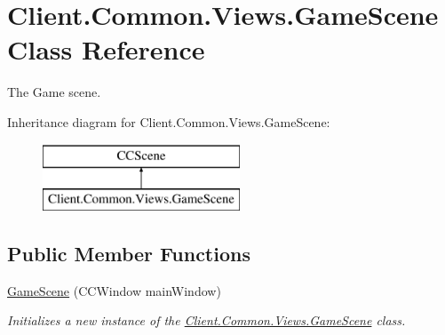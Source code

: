 \hypertarget{classClient_1_1Common_1_1Views_1_1GameScene}{}\section{Client.\+Common.\+Views.\+Game\+Scene Class Reference}
\label{classClient_1_1Common_1_1Views_1_1GameScene}


The Game scene.  


Inheritance diagram for Client.\+Common.\+Views.\+Game\+Scene\+:\begin{figure}[H]
\begin{center}
\leavevmode
\includegraphics[height=2.000000cm]{classClient_1_1Common_1_1Views_1_1GameScene}
\end{center}
\end{figure}
\subsection*{Public Member Functions}
\begin{DoxyCompactItemize}
\item 
\hyperlink{classClient_1_1Common_1_1Views_1_1GameScene_a946494de04b027e43b5d2229cc780f7e}{Game\+Scene} (C\+C\+Window main\+Window)
\begin{DoxyCompactList}\small\item\em Initializes a new instance of the \hyperlink{classClient_1_1Common_1_1Views_1_1GameScene}{Client.\+Common.\+Views.\+Game\+Scene} class. \end{DoxyCompactList}\end{DoxyCompactItemize}
